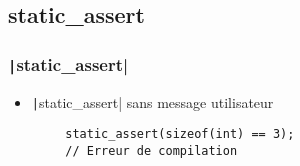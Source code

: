 \documentclass[C++.tex]{subfiles}
\begin{document}
\subsection*{static\_assert}
\begin{frame}[fragile]
	\frametitle{\texttt|static_assert|}
	\begin{itemize}
		\item \texttt|static_assert| sans message utilisateur
	\end{itemize}

	\begin{verbatim}
		static_assert(sizeof(int) == 3);
		// Erreur de compilation
	\end{verbatim}


\end{frame}
\end{document}
